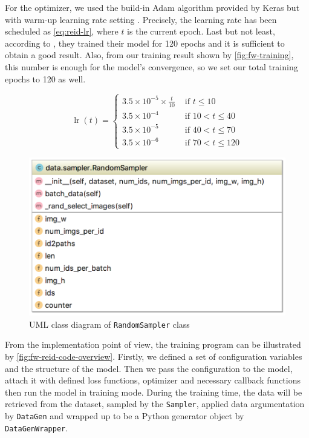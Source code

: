 For the optimizer, we used the build-in Adam algorithm provided by Keras
but with warm-up learning rate setting \cite{learning-rate-warmup-2018}.
Precisely, the learning rate has been scheduled as \autoref{eq:reid-lr}, where 
$t$ is the current epoch. Last but not least, according to
\cite{tricks-and-baseline-for-reid-2019}, they trained their model for 120
epochs and it is sufficient to obtain a good result. Also, from our training
result shown by \autoref{fig:fw-training}, this number is enough for the
model's convergence, so we set our total training epochs to 120 as well.

\begin{equation}
\label{eq:reid-lr}
\operatorname{lr}(t)=\left\{
\begin{array}{ll}
{3.5 \times 10^{-5} \times \frac{t}{10}} & {\text { if } t \leq 10} \\
{3.5 \times 10^{-4}} & {\text { if } 10<t \leq 40} \\
{3.5 \times 10^{-5}} & {\text { if } 40<t \leq 70} \\
{3.5 \times 10^{-6}} & {\text { if } 70<t \leq 120}
\end{array}\right.
\end{equation}

\begin{figure}
    \begin{center}
        \includegraphics[scale=0.6]{figures/framework_reid_sampler_uml.png}
    \end{center}
    \caption{UML class diagram of \texttt{RandomSampler} class}
    \label{fig:fw-sampler-uml}
\end{figure}

From the implementation point of view, the training program can be illustrated by
\autoref{fig:fw-reid-code-overview}. Firstly, we defined a set of configuration
variables and the structure of the model. Then we pass the configuration to the
model, attach it with defined loss functions, optimizer and necessary
callback functions then run the model in training mode. During the training
time, the data will be retrieved from the dataset, sampled by the
\texttt{Sampler}, applied data argumentation by \texttt{DataGen} and wrapped
up to be a Python generator object by \texttt{DataGenWrapper}.

